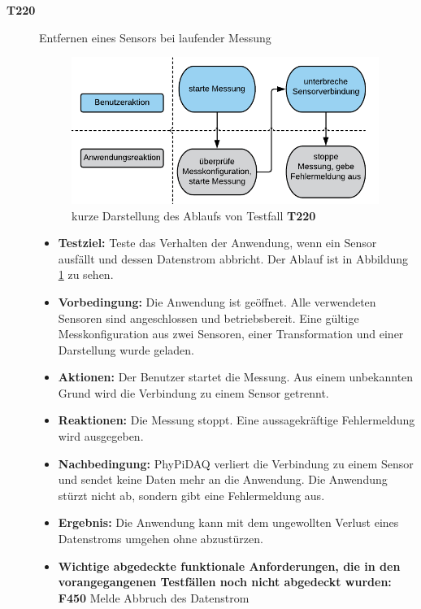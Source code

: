 \documentclass[parskip=full]{scrartcl}
\begin{document}
\begin{description}
\item[\textbf{T220}] Entfernen eines Sensors bei laufender Messung

\begin{figure}[htbp]
	\begin{center}
		\includegraphics[width = 10cm]{Grafik/T220-Ablauf.png}
		\caption{kurze Darstellung des Ablaufs von Testfall \textbf{T220}}
		\label{T220-Ablauf}
	\end{center}
\end{figure}
\begin{itemize}

\item []\textbf{Testziel:} Teste das Verhalten der Anwendung, wenn ein Sensor ausfällt und dessen Datenstrom abbricht. Der Ablauf ist in Abbildung \ref{T220-Ablauf} zu sehen.

\item []\textbf{Vorbedingung:} Die Anwendung ist geöffnet. Alle verwendeten Sensoren sind angeschlossen und betriebsbereit. Eine gültige Messkonfiguration aus zwei Sensoren, einer Transformation und einer Darstellung wurde geladen.
\item []\textbf{Aktionen:} Der Benutzer startet die Messung. Aus einem unbekannten Grund wird die Verbindung zu einem Sensor getrennt.
\item []\textbf{Reaktionen:} Die Messung stoppt. Eine aussagekräftige Fehlermeldung wird ausgegeben.
\item []\textbf{Nachbedingung:} \gls{PhyPiDAQ} verliert die Verbindung zu einem Sensor und sendet keine Daten mehr an die Anwendung. Die Anwendung stürzt nicht ab, sondern gibt eine Fehlermeldung aus.

\item []\textbf{Ergebnis:} Die Anwendung kann mit dem ungewollten Verlust eines Datenstroms umgehen ohne abzustürzen.
\item []\textbf{Wichtige abgedeckte funktionale Anforderungen, die in den vorangegangenen Testfällen noch nicht abgedeckt wurden:} \textbf{F450} Melde Abbruch des Datenstrom

\end{itemize}


\end{description}
\end{document}

